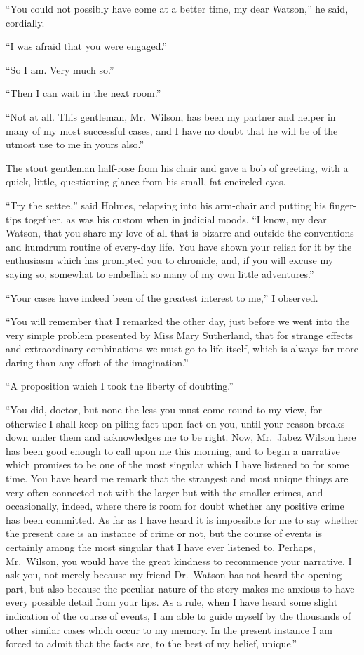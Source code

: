 “You could not possibly have come at a better time, my
dear Watson,” he said, cordially.

“I was afraid that you were engaged.”

“So I am. Very much so.”

“Then I can wait in the next room.”

“Not at all. This gentleman, Mr.~Wilson, has been my
partner and helper in many of my most successful cases, and
I have no doubt that he will be of the utmost use to me in
yours also.”

The stout gentleman half-rose from his chair and gave a
bob of greeting, with a quick, little, questioning glance from
his small, fat-encircled eyes.

“Try the settee,” said Holmes, relapsing into his arm-chair
and putting his finger-tips together, as was his custom when
in judicial moods. “I know, my dear Watson, that you share
my love of all that is bizarre and outside the conventions and
humdrum routine of every-day life. You have shown your
relish for it by the enthusiasm which has prompted you to
chronicle, and, if you will excuse my saying so, somewhat to
embellish so many of my own little adventures.”

“Your cases have indeed been of the greatest interest to
me,” I observed.

“You will remember that I remarked the other day, just
before we went into the very simple problem presented by
Miss Mary Sutherland, that for strange effects and extraordinary
combinations we must go to life itself, which is always
far more daring than any effort of the imagination.”

“A proposition which I took the liberty of doubting.”

“You did, doctor, but none the less you must come round
to my view, for otherwise I shall keep on piling fact upon fact
on you, until your reason breaks down under them and acknowledges
me to be right. Now, Mr.~Jabez Wilson here has
been good enough to call upon me this morning, and to begin
a narrative which promises to be one of the most singular
which I have listened to for some time. You have heard me
remark that the strangest and most unique things are very
often connected not with the larger but with the smaller
crimes, and occasionally, indeed, where there is room for
doubt whether any positive crime has been committed. As
far as I have heard it is impossible for me to say whether the
present case is an instance of crime or not, but the course of
events is certainly among the most singular that I have ever
listened to. Perhaps, Mr.~Wilson, you would have the great
kindness to recommence your narrative. I ask you, not
merely because my friend Dr.\ Watson has not heard the
opening part, but also because the peculiar nature of the story
makes me anxious to have every possible detail from your
lips. As a rule, when I have heard some slight indication of
the course of events, I am able to guide myself by the thousands
of other similar cases which occur to my memory. In
the present instance I am forced to admit that the facts are,
to the best of my belief, unique.”

